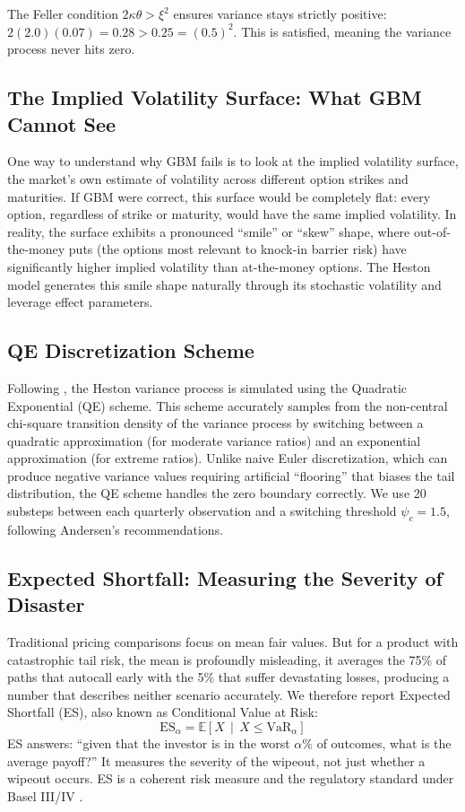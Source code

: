 \documentclass[12pt,a4paper]{article}
\begin{document}
The Feller condition $2\kappa\theta > \xi^2$ ensures variance stays strictly positive: $2(2.0)(0.07) = 0.28 > 0.25 = (0.5)^2$. This is satisfied, meaning the variance process never hits zero.

\subsection{The Implied Volatility Surface: What GBM Cannot See}

One way to understand why GBM fails is to look at the implied volatility surface, the market's own estimate of volatility across different option strikes and maturities. If GBM were correct, this surface would be completely flat: every option, regardless of strike or maturity, would have the same implied volatility. In reality, the surface exhibits a pronounced ``smile'' or ``skew'' shape, where out-of-the-money puts (the options most relevant to knock-in barrier risk) have significantly higher implied volatility than at-the-money options. The Heston model generates this smile shape naturally through its stochastic volatility and leverage effect parameters.

\subsection{QE Discretization Scheme}

Following \citet{andersen2008}, the Heston variance process is simulated using the Quadratic Exponential (QE) scheme. This scheme accurately samples from the non-central chi-square transition density of the variance process by switching between a quadratic approximation (for moderate variance ratios) and an exponential approximation (for extreme ratios). Unlike naive Euler discretization, which can produce negative variance values requiring artificial ``flooring'' that biases the tail distribution, the QE scheme handles the zero boundary correctly. We use 20 substeps between each quarterly observation and a switching threshold $\psi_c = 1.5$, following Andersen's recommendations.

\subsection{Expected Shortfall: Measuring the Severity of Disaster}

Traditional pricing comparisons focus on mean fair values. But for a product with catastrophic tail risk, the mean is profoundly misleading, it averages the 75\% of paths that autocall early with the 5\% that suffer devastating losses, producing a number that describes neither scenario accurately. We therefore report Expected Shortfall (ES), also known as Conditional Value at Risk:
\begin{equation}
    \text{ES}_\alpha = \mathbb{E}\left[X \,\middle|\, X \leq \text{VaR}_\alpha\right]
\end{equation}
ES answers: ``given that the investor is in the worst $\alpha\%$ of outcomes, what is the average payoff?'' It measures the severity of the wipeout, not just whether a wipeout occurs. ES is a coherent risk measure \citep{acerbi2002} and the regulatory standard under Basel III/IV \citep{bcbs2019}.
\end{document}
